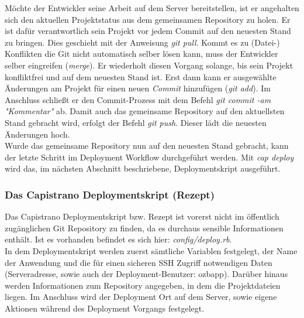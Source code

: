 \documentclass[12pt,             %
               a4paper,          %
               listof=totoc,     %
               index=totoc,      %
               bibliography=totoc,%
               oneside,         %
               BCOR1cm,          %
               english   %
               ]{scrbook}
\begin{document}
Möchte der Entwickler seine Arbeit auf dem Server bereitstellen, ist er angehalten sich den aktuellen Projektstatus aus dem gemeinsamen Repository zu holen. Er ist dafür verantwortlich sein Projekt vor jedem Commit auf den neuesten Stand zu bringen. Dies geschieht mit der Anweisung \textit{git pull}. Kommt es zu (Datei-) Konflikten die Git nicht automatisch selber lösen kann, muss der Entwickler selber eingreifen (\textit{merge}). Er wiederholt diesen Vorgang solange, bis sein Projekt konfliktfrei und auf dem neuesten Stand ist. Erst dann kann er ausgewählte Änderungen am Projekt für einen neuen \textit{Commit} hinzufügen (\textit{git add}). Im Anschluss schließt er den Commit-Prozess mit dem Befehl \textit{git commit -am "Kommentar"} ab. Damit auch das gemeinsame Repository auf den aktuellsten Stand gebracht wird, erfolgt der Befehl \textit{git push}. Dieser lädt die neuesten Änderungen hoch.\\

Wurde das gemeinsame Repository nun auf den neuesten Stand gebracht, kann der letzte Schritt im Deployment Workflow durchgeführt werden. Mit \textit{cap deploy} wird das, im nächsten Abschnitt beschriebene, Deploymentskript ausgeführt. 

\subsubsection{Das Capistrano Deploymentskript (Rezept)}\label{subsec:deployment_recipe}
Das Capistrano Deploymentskript bzw. Rezept ist vorerst nicht im öffentlich zugänglichen Git Repository zu finden, da es durchaus sensible Informationen enthält. Ist es vorhanden befindet es sich hier: \textit{config/deploy.rb}.\\
In dem Deploymentskript werden zuerst sämtliche Variablen festgelegt, der Name der Anwendung und die für einen sicheren SSH Zugriff notwendigen Daten (Serveradresse, sowie auch der Deployment-Benutzer: \glqq ozbapp\grqq). Darüber hinaus werden Informationen zum Repository angegeben, in dem die Projektdateien liegen. Im Anschluss wird der Deployment Ort auf dem Server, sowie eigene Aktionen während des Deployment Vorgangs festgelegt.
\end{document}
